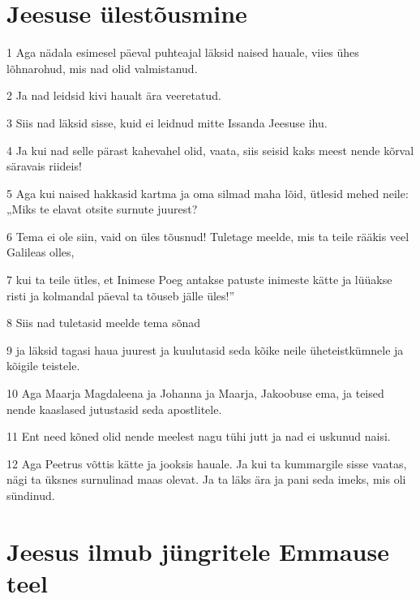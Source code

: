 \section*{Jeesuse ülestõusmine}

\par 1 Aga nädala esimesel päeval puhteajal läksid naised hauale, viies ühes lõhnarohud, mis nad olid valmistanud.
\par 2 Ja nad leidsid kivi haualt ära veeretatud.
\par 3 Siis nad läksid sisse, kuid ei leidnud mitte Issanda Jeesuse ihu.
\par 4 Ja kui nad selle pärast kahevahel olid, vaata, siis seisid kaks meest nende kõrval säravais riideis!
\par 5 Aga kui naised hakkasid kartma ja oma silmad maha lõid, ütlesid mehed neile: „Miks te elavat otsite surnute juurest?
\par 6 Tema ei ole siin, vaid on üles tõusnud! Tuletage meelde, mis ta teile rääkis veel Galileas olles,
\par 7 kui ta teile ütles, et Inimese Poeg antakse patuste inimeste kätte ja lüüakse risti ja kolmandal päeval ta tõuseb jälle üles!”
\par 8 Siis nad tuletasid meelde tema sõnad
\par 9 ja läksid tagasi haua juurest ja kuulutasid seda kõike neile üheteistkümnele ja kõigile teistele.
\par 10 Aga Maarja Magdaleena ja Johanna ja Maarja, Jakoobuse ema, ja teised nende kaaslased jutustasid seda apostlitele.
\par 11 Ent need kõned olid nende meelest nagu tühi jutt ja nad ei uskunud naisi.
\par 12 Aga Peetrus võttis kätte ja jooksis hauale. Ja kui ta kummargile sisse vaatas, nägi ta üksnes surnulinad maas olevat. Ja ta läks ära ja pani seda imeks, mis oli sündinud.

\section*{Jeesus ilmub jüngritele Emmause teel}

